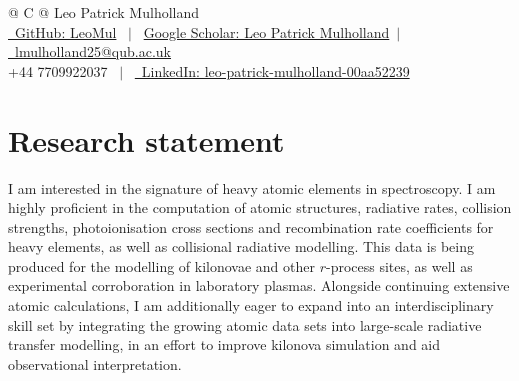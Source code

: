 \documentclass[a4paper,11pt]{article}
\begin{document}
\pagestyle{empty} 



\begin{tabularx}{\linewidth}{@{} C @{}}
\Huge{Leo Patrick Mulholland} \\[7.5pt]
\href{https://github.com/LeoMul}{\raisebox{-0.05\height}\ GitHub: LeoMul}   \ $|$ \ \href{https://scholar.google.com/citations?user=at8xXbEAAAAJ\&hl=en}{Google Scholar: Leo Patrick Mulholland}\ $|$
\href{mailto:lmulholland25@qub.ac.uk}{\raisebox{-0.05\height} \ lmulholland25@qub.ac.uk} \  
\\ { +44 7709922037} \ $|$ \ 
\href{https://www.linkedin.com/in/leo-patrick-mulholland-00aa52239/}{\raisebox{-0.05\height}\ LinkedIn: leo-patrick-mulholland-00aa52239}\\
\end{tabularx}



\section{Research statement}


I am interested in the signature of heavy atomic elements in spectroscopy. I am highly proficient in the computation of atomic structures, radiative rates,  collision strengths, photoionisation cross sections and recombination rate coefficients for heavy  elements, as well as collisional radiative modelling. This data is being produced for the modelling of kilonovae and other $r$-process sites, as well as experimental corroboration in laboratory plasmas. Alongside continuing extensive atomic calculations, I am additionally eager to expand into an interdisciplinary skill set by integrating the growing atomic data sets into large-scale radiative transfer modelling, in an effort to improve kilonova simulation and aid observational interpretation.
\end{document}
